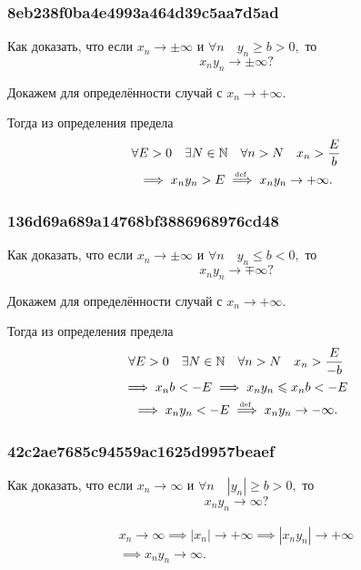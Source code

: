 \documentclass[11pt, a5paper]{article}
\newenvironment{note}[1]{\goodbreak\par\subsubsection{\hfill \color{lightgray}\tiny #1}}{}
\newenvironment{cloze}[2][\ldots]{\begin{leftbar}}{\end{leftbar}}
\begin{document}
    \begin{note}{8eb238f0ba4e4993a464d39c5aa7d5ad}
		Как доказать, что если \( x_n \to \pm \infty  \) и \( \forall n \quad y_n \geqslant b > 0,  \) то \[
            x_n y_n \to \pm \infty?
		\]

        \begin{cloze}{1}
            Докажем для определённости случай с \( x_n \to +\infty. \)

            Тогда из определения предела
            \begin{multline*}
                \forall E > 0 \quad \exists N \in \mathbb N \quad \forall n > N \quad x_n > \frac{E}{b} \\
                \implies x_n y_n > E \overset{\!\!\text{\tiny def}}\implies x_n y_n \to +\infty.
            \end{multline*}
        \end{cloze}
    \end{note}

    \begin{note}{136d69a689a14768bf3886968976cd48}
		Как доказать, что если \( x_n \to \pm \infty  \) и \( \forall n \quad y_n \leqslant b < 0,  \) то \[
            x_n y_n \to \mp \infty?
		\]

        \begin{cloze}{1}
            Докажем для определённости случай с \( x_n \to +\infty. \)

            Тогда из определения предела
            \begin{multline*}
                \forall E > 0 \quad \exists N \in \mathbb N \quad \forall n > N \quad x_n > \frac{E}{-b} \\
                \implies x_n b < -E \implies x_n y_n \leqslant x_n b < -E \\
                \implies x_n y_n < -E \overset{\!\!\text{\tiny def}}\implies x_n y_n \to -\infty.
            \end{multline*}
        \end{cloze}
    \end{note}

    \begin{note}{42c2ae7685c94559ac1625d9957beaef}
		Как доказать, что если \( x_n \to \infty  \) и \( \forall n \quad |y_n| \geqslant b > 0,  \) то \[
            x_n y_n \to \infty?
		\]

        \begin{cloze}{1}
            \begin{multline*}
                x_n \to \infty \implies |x_n| \to +\infty \implies |x_n y_n| \to +\infty \\
                \implies x_n y_n \to \infty.
            \end{multline*}
        \end{cloze}
    \end{note}
\end{document}

